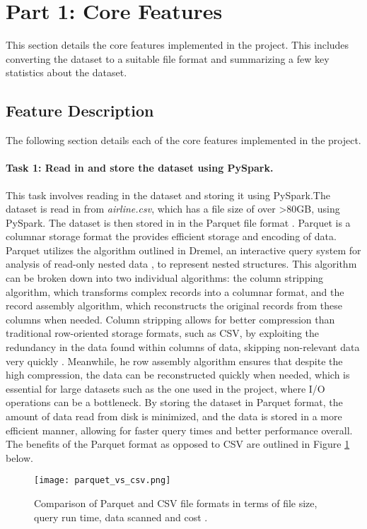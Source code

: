 \section{Part 1: Core Features}
This section details the core features implemented in the project. This includes converting the dataset to a suitable file format and summarizing a few key statistics about the dataset.

\subsection{Feature Description}
The following section details each of the core features implemented in the project.

\paragraph{Task 1: Read in and store the dataset using PySpark.} This task involves reading in the dataset and storing it using PySpark.The dataset is read in from \textit{airline.csv}, which has a file size of over \textgreater 80GB, using PySpark. The dataset is then stored in in the Parquet file format \cite{parquet}. Parquet is a columnar storage format the provides efficient storage and encoding of data. Parquet utilizes the algorithm outlined in Dremel, an interactive query system for analysis of read-only nested data \cite{36632}, to represent nested structures. This algorithm can be broken down into two individual algorithms: the column stripping algorithm, which transforms complex records into a columnar format, and the record assembly algorithm, which reconstructs the original records from these columns when needed. Column stripping allows for better compression than traditional row-oriented storage formats, such as CSV, by exploiting the redundancy in the data found within columns of data, skipping non-relevant data very quickly \cite{Databricks}. Meanwhile, he row assembly algorithm ensures that despite the high compression, the data can be reconstructed quickly when needed, which is essential for large datasets such as the one used in the project, where I/O operations can be a bottleneck. By storing the dataset in Parquet format, the amount of data read from disk is minimized, and the data is stored in a more efficient manner, allowing for faster query times and better performance overall. The benefits of the Parquet format as opposed to CSV are outlined in Figure \ref{fig:parquet_vs_csv} below.

\begin{figure}[H]
  \texttt{[image: parquet\_vs\_csv.png]}
  \caption{Comparison of Parquet and CSV file formats in terms of file size, query run time, data scanned and cost \cite{Databricks}.}
  \label{fig:parquet_vs_csv}
\end{figure}

